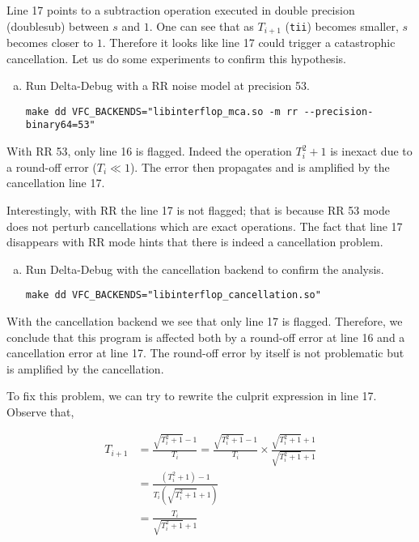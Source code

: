 Line 17 points to a subtraction operation executed in double precision (doublesub) between $s$ and $1$. One can see that as $T_{i+1}$ (\texttt{tii}) becomes smaller, $s$ becomes closer to $1$. Therefore it looks like line 17 could trigger a catastrophic cancellation.
Let us do some experiments to confirm this hypothesis.

\begin{question}
  \begin{enumerate}[(a)]
    \item Run Delta-Debug with a RR noise model at precision 53.
          \begin{verbatim}
make dd VFC_BACKENDS="libinterflop_mca.so -m rr --precision-binary64=53"
      \end{verbatim}
  \end{enumerate}
\end{question}

With RR 53, only line 16 is flagged. Indeed the operation $T_i^2+1$ is inexact
due to a round-off error ($T_i \ll 1$). The error then propagates and is amplified
by the cancellation line 17.

Interestingly, with RR the line 17 is not flagged; that is because RR 53 mode
does not perturb cancellations which are exact operations. The fact that line
17 disappears with RR mode hints that there is indeed a cancellation problem.

\begin{question}
  \begin{enumerate}[(a)]
    \item Run Delta-Debug with the cancellation backend to confirm the analysis.
          \begin{verbatim}
make dd VFC_BACKENDS="libinterflop_cancellation.so"
      \end{verbatim}
  \end{enumerate}
\end{question}

With the cancellation backend we see that only line 17 is flagged.
Therefore, we conclude that this program is affected both by a round-off error
at line 16 and a cancellation error at line 17. The round-off error by itself
is not problematic but is amplified by the cancellation.

To fix this problem, we can try to rewrite the culprit expression in line 17.
Observe that,

\begin{align*}
  T_{i+1} & = \frac{\sqrt{T_i^2+1} - 1}{T_i} = \frac{\sqrt{T_i^2+1} - 1}{T_i} \times \frac{\sqrt{T_i^2+1} + 1}{\sqrt{T_i^2+1} + 1} \\
          & = \frac{(T_i^2 + 1) - 1}{T_i(\sqrt{T_i^2+1} + 1)}                                                                      \\
          & = \frac{T_i}{\sqrt{T_i^2+1} + 1}
\end{align*}

